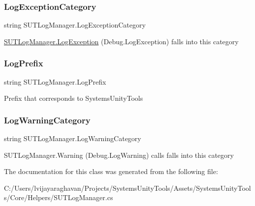 \subsubsection{\texorpdfstring{Log\+Exception\+Category}{LogExceptionCategory}}
{\footnotesize\ttfamily string S\+U\+T\+Log\+Manager.\+Log\+Exception\+Category\hspace{0.3cm}{\ttfamily [get]}}



\mbox{\hyperlink{class_s_u_t_log_manager_a63a6a0200263f36810d6ede9ca578942}{S\+U\+T\+Log\+Manager.\+Log\+Exception}} (Debug.\+Log\+Exception) falls into this category 

\mbox{\label{class_s_u_t_log_manager_a2e22a0dcde8c520e2b74ac0c42760941}} 
\subsubsection{\texorpdfstring{Log\+Prefix}{LogPrefix}}
{\footnotesize\ttfamily string S\+U\+T\+Log\+Manager.\+Log\+Prefix\hspace{0.3cm}{\ttfamily [get]}}



Prefix that corresponds to Systems\+Unity\+Tools 

\mbox{\label{class_s_u_t_log_manager_a112da3e3ed2a3044086b831629bbf192}} 
\subsubsection{\texorpdfstring{Log\+Warning\+Category}{LogWarningCategory}}
{\footnotesize\ttfamily string S\+U\+T\+Log\+Manager.\+Log\+Warning\+Category\hspace{0.3cm}{\ttfamily [get]}}



S\+U\+T\+Log\+Manager.\+Warning (Debug.\+Log\+Warning) calls falls into this category 



The documentation for this class was generated from the following file\+:\begin{DoxyCompactItemize}
\item 
C\+:/\+Users/lvijayaraghavan/\+Projects/\+Systems\+Unity\+Tools/\+Assets/\+Systems\+Unity\+Tools/\+Core/\+Helpers/S\+U\+T\+Log\+Manager.\+cs\end{DoxyCompactItemize}
